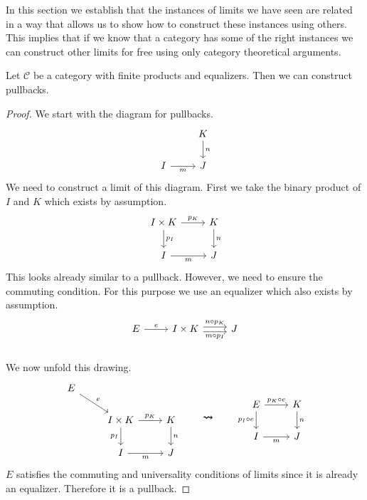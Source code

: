 In this section we establish that the instances of limits we have seen are related
in a way that allows us to show how to construct these instances using others.
This implies that if we know that a category has some of the right instances
we can construct other limits for free using only category theoretical arguments.

\begin{theorem}
  \label{pullbackconstruction}
  Let $\mathscr C$ be a category with finite products and equalizers.
  Then we can construct pullbacks.
\end{theorem}
\begin{proof}
We start with the diagram for pullbacks.
\[
  \begin{tikzcd}
    & K \arrow{d}{n} \\
    I \arrow[swap]{r}{m} & J
  \end{tikzcd}
\]
We need to construct a limit of this diagram.
First we take the binary product of $I$ and $K$ which exists by assumption.
\[
  \begin{tikzcd}
    I \times K \arrow{r}{p_K} \arrow{d}{p_I} & K \arrow{d}{n} \\
    I \arrow[swap]{r}{m} & J
  \end{tikzcd}
\]
This looks already similar to a pullback.
However, we need to ensure the commuting condition.
For this purpose we use an equalizer which also exists by assumption.
\[
  \begin{tikzcd}
    E \arrow{r}{e} &
    I \times K
    \arrow[r,shift right,swap, "m \circ p_I"] \arrow[r,shift left, "n \circ p_K"]
    & J \\
  \end{tikzcd}
\]
We now unfold this drawing.
\[
  \begin{tikzcd}
    E \arrow{dr}{e}& &\\
    & I \times K \arrow[swap]{d}{p_I} \arrow{r}{p_K}& K \arrow{d}{n}\\
    & I \arrow[swap]{r}{m} & J
  \end{tikzcd}
  \qquad \bm{\rightsquigarrow} \qquad 
  \begin{tikzcd}
    E \arrow[swap]{d}{p_I \circ e} \arrow{r}{p_K \circ e} & K \arrow{d}{n} \\
    I \arrow[swap]{r}{m} & J
  \end{tikzcd}
\]
$E$ satisfies the commuting and universality conditions of limits
since it is already an equalizer.
Therefore it is a pullback.
\end{proof}


